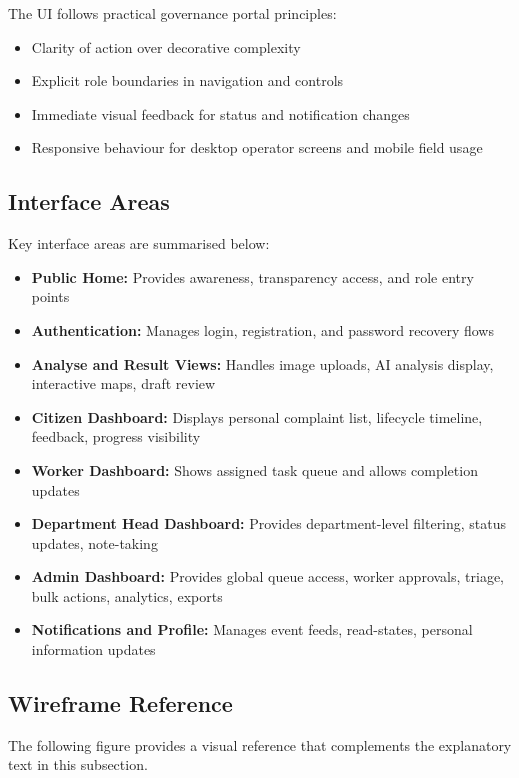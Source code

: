 The UI follows practical governance portal principles:

\begin{itemize}
\item Clarity of action over decorative complexity
\item Explicit role boundaries in navigation and controls
\item Immediate visual feedback for status and notification changes
\item Responsive behaviour for desktop operator screens and mobile field usage
\end{itemize}

\subsection{Interface Areas}

Key interface areas are summarised below:

\begin{itemize}
\item \textbf{Public Home:} Provides awareness, transparency access, and role entry points
\item \textbf{Authentication:} Manages login, registration, and password recovery flows
\item \textbf{Analyse and Result Views:} Handles image uploads, AI analysis display, interactive maps, draft review
\item \textbf{Citizen Dashboard:} Displays personal complaint list, lifecycle timeline, feedback, progress visibility
\item \textbf{Worker Dashboard:} Shows assigned task queue and allows completion updates
\item \textbf{Department Head Dashboard:} Provides department-level filtering, status updates, note-taking
\item \textbf{Admin Dashboard:} Provides global queue access, worker approvals, triage, bulk actions, analytics, exports
\item \textbf{Notifications and Profile:} Manages event feeds, read-states, personal information updates
\end{itemize}

\subsection{Wireframe Reference}

The following figure provides a visual reference that complements the explanatory text in this subsection.

